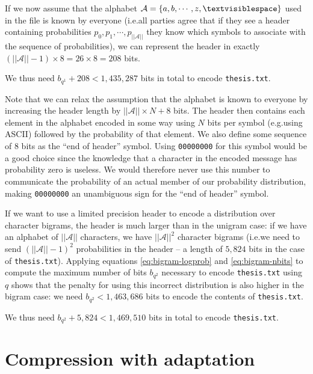 \documentclass[10pt,a4paper,oneside,onecolumn]{article}
\makeatletter
\newcommand*{\thesisTXT}{{\tt thesis.txt}\xspace}
\newcommand*{\eg}{e.g.\@}
\newcommand*{\ie}{i.e.\@}
\newcommand*{\norm}[1]{\ensuremath{\left|\left|#1\right|\right|}}
\newcommand*{\lbr}{\ensuremath{\left\{}}
\newcommand*{\rbr}{\ensuremath{\right\}}}
\makeatother
\begin{document}
If we now assume that the alphabet $\mathcal{A} = \lbr a, b, \cdots, z,
\textvisiblespace \rbr$ used in the file is known by everyone (\ie all parties
agree that if they see a header containing probabilities $p_0, p_1, \cdots,
p_{\norm{\mathcal{A}}}$ they know which symbols to associate with the sequence
of probabilities), we can represent the header in exactly $(\norm{\mathcal{A}} -
1) \times 8 = 26 \times 8 = 208$ bits.\footnotemark

We thus need $b_{q^1} + 208 < 1,435,287$ bits in total to encode \thesisTXT.


Note that we can relax the assumption that the alphabet is known to everyone by
increasing the header length by $\norm{\mathcal{A}} \times N + 8$ bits. The
header then contains each element in the alphabet encoded in some way using $N$
bits per symbol (\eg using ASCII) followed by the probability of that element.
We also define some sequence of 8 bits as the ``end of header'' symbol. Using
{\tt 00000000} for this symbol would be a good choice since the knowledge that a
character in the encoded message has probability zero is useless. We would
therefore never use this number to communicate the probability of an actual
member of our probability distribution, making {\tt 00000000} an unambiguous
sign for the ``end of header'' symbol.

If we want to use a limited precision header to encode a distribution over
character bigrams, the header is much larger than in the unigram case: if we
have an alphabet of $\norm{\mathcal{A}}$ characters, we have
$\norm{\mathcal{A}}^2$ character bigrams (\ie we need to send
$(\norm{\mathcal{A}} - 1)^2$ probabilities in the header -- a length of $5,824$
bits in the case of \thesisTXT). Applying equations \eqref{eq:bigram-logprob}
and \eqref{eq:bigram-nbits} to compute the maximum number of bits $b_{q^2}$
necessary to encode \thesisTXT using $q$ shows that the penalty for using this
incorrect distribution is also higher in the bigram case: we need $b_{q^2} <
1,463,686$ bits to encode the contents of \thesisTXT\@.

We thus need $b_{q^2} + 5,824 < 1,469,510$ bits in total to encode \thesisTXT.

\section{Compression with adaptation}\label{sec:ex5}
\end{document}
